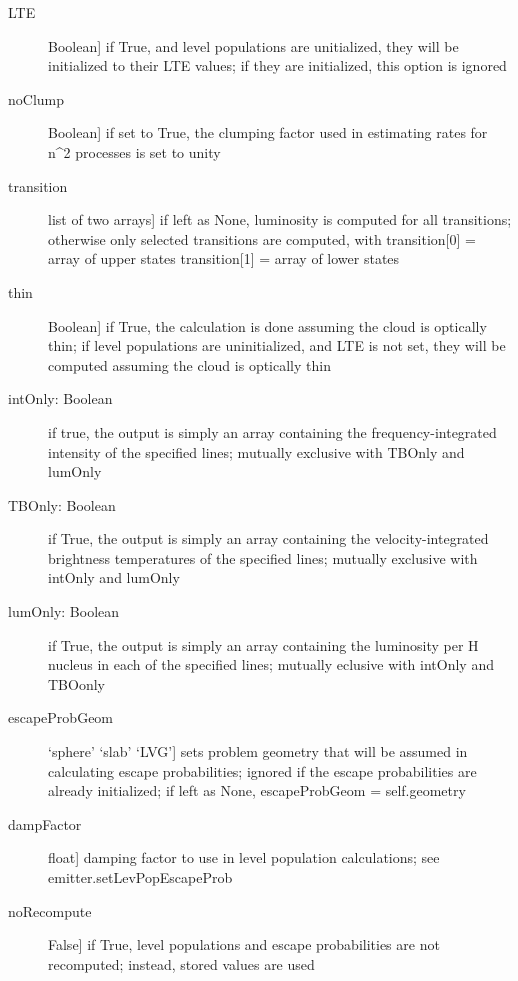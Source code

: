 \documentclass[letterpaper,10pt,english]{sphinxmanual}
\begin{document}
\begin{fulllineitems}
\begin{fulllineitems}
\begin{description}
\begin{description}
\item[{LTE}] \leavevmode{[}Boolean{]}
if True, and level populations are unitialized, they will
be initialized to their LTE values; if they are
initialized, this option is ignored

\item[{noClump}] \leavevmode{[}Boolean{]}
if set to True, the clumping factor used in estimating
rates for n\textasciicircum{}2 processes is set to unity

\item[{transition}] \leavevmode{[}list of two arrays{]}
if left as None, luminosity is computed for all
transitions; otherwise only selected transitions are
computed, with transition{[}0{]} = array of upper states
transition{[}1{]} = array of lower states

\item[{thin}] \leavevmode{[}Boolean{]}
if True, the calculation is done assuming the cloud is
optically thin; if level populations are uninitialized,
and LTE is not set, they will be computed assuming the
cloud is optically thin

\item[{intOnly: Boolean}] \leavevmode
if true, the output is simply an array containing the
frequency-integrated intensity of the specified lines;
mutually exclusive with TBOnly and lumOnly

\item[{TBOnly: Boolean}] \leavevmode
if True, the output is simply an array containing the
velocity-integrated brightness temperatures of the
specified lines; mutually exclusive with intOnly and
lumOnly

\item[{lumOnly: Boolean}] \leavevmode
if True, the output is simply an array containing the
luminosity per H nucleus in each of the specified lines;
mutually eclusive with intOnly and TBOonly

\item[{escapeProbGeom}] \leavevmode{[}`sphere' \textbar{} `slab' \textbar{} `LVG'{]}
sets problem geometry that will be assumed in calculating
escape probabilities; ignored if the escape probabilities
are already initialized; if left as None, escapeProbGeom
= self.geometry

\item[{dampFactor}] \leavevmode{[}float{]}
damping factor to use in level population calculations;
see emitter.setLevPopEscapeProb

\item[{noRecompute}] \leavevmode{[}False{]}
if True, level populations and escape probabilities are
not recomputed; instead, stored values are used


\end{description}
\end{description}
\end{fulllineitems}
\end{fulllineitems}
\end{document}
